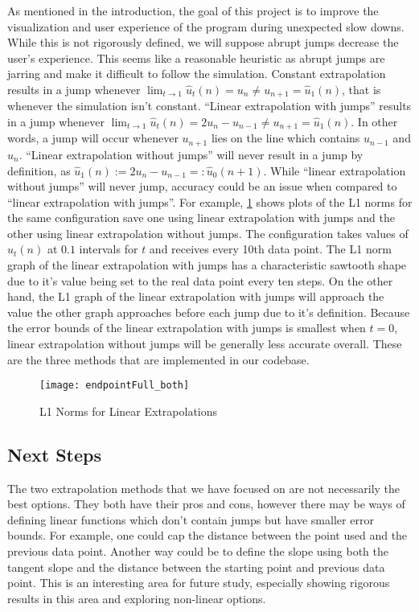 As mentioned in the introduction, the goal of this project is to improve the visualization and user experience of the program during unexpected slow downs.
While this is not rigorously defined, we will suppose abrupt jumps decrease the user's experience.
This seems like a reasonable heuristic as abrupt jumps are jarring and make it difficult to follow the simulation.
Constant extrapolation results in a jump whenever $\lim_{t\to1}\hat{u}_t(n) = u_n \not= u_{n+1} = \hat{u}_1(n)$, that is whenever the simulation isn't constant.
``Linear extrapolation with jumps'' results in a jump whenever $\lim_{t\to1}\hat{u}_t(n) = 2u_n - u_{n-1} \not= u_{n+1} = \hat{u}_1(n)$.
In other words, a jump will occur whenever $u_{n+1}$ lies on the line which contains $u_{n-1}$ and $u_n$.
``Linear extrapolation without jumps'' will never result in a jump by definition, as $\hat{u}_1(n) := 2u_n - u_{n-1} =: \hat{u}_0(n+1)$.
While ``linear extrapolation without jumps'' will never jump, accuracy could be an issue when compared to ``linear extrapolation with jumps''.
For example, \cref{fig:l1} shows plots of the L1 norms for the same configuration save one using linear extrapolation with jumps and the other using linear extrapolation without jumps.
The configuration takes values of $\hat{u}_t(n)$ at $0.1$ intervals for $t$ and receives every 10th data point.
The L1 norm graph of the linear extrapolation with jumps has a characteristic sawtooth shape due to it's value being set to the real data point every ten steps.
On the other hand, the L1 graph of the linear extrapolation with jumps will approach the value the other graph approaches before each jump due to it's definition.
Because the error bounds of the linear extrapolation with jumps is smallest when $t=0$, linear extrapolation without jumps will be generally less accurate overall.
These are the three methods that are implemented in our codebase.

\begin{figure}[H]
    \centering
    \texttt{[image: endpointFull\_both]}
    \caption{L1 Norms for Linear Extrapolations}%
    \label{fig:l1}
\end{figure}


\subsection{Next Steps}%
\label{sub:next_steps}

The two extrapolation methods that we have focused on are not necessarily the best options.
They both have their pros and cons, however there may be ways of defining linear functions which don't contain jumps but have smaller error bounds.
For example, one could cap the distance between the point used and the previous data point.
Another way could be to define the slope using both the tangent slope and the distance between the starting point and previous data point.
This is an interesting area for future study, especially showing rigorous results in this area and exploring non-linear options.
